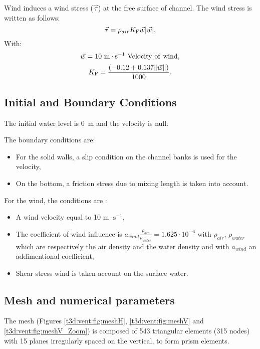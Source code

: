 \bigskip
Wind induces a wind stress ($\vec{\tau}$) at the free surface of channel.
The wind stress is written as follows:
\begin{equation*}
\vec{\tau}=\rho_{air}K_{\rm{F}} \vec w |\vec w|,
\end{equation*}
With:
\begin{equation*}
\vec w = 10~\text{m}\cdot\text{s}^{-1}\rm{~Velocity~of~wind},
\end{equation*}
\begin{equation*}
K_{\rm{F}} = \frac{(-0.12 + 0.137 \| \vec w \| )}{1000}.
\end{equation*}

\subsection{Initial and Boundary Conditions}

\bigskip
The initial water level is 0~m and the velocity is null.

\bigskip
The boundary conditions are:
\begin{itemize}
\item For the solid walls, a slip condition on the channel banks is used
for the velocity,
\item On the bottom, a friction stress due to mixing length is taken into account.
\end{itemize}
For the wind, the conditions are :
\begin{itemize}
\item A wind velocity equal to 10 $\text{m}\cdot\text{s}^{-1}$,
\item The coefficient of wind influence is $a_{wind} \frac{\rho_{air}}
{\rho_{water}} = 1.625 \cdot 10^{-6}$ with $\rho_{air}$, $\rho_{water}$
which are respectively the air density and the water density and
with $a_{wind}$ an addimentional coefficient,
\item Shear stress wind is taken account on the surface water.
\end{itemize}

\subsection{Mesh and numerical parameters}
\bigskip
The mesh (Figures \ref{t3d:vent:fig:meshH}, \ref{t3d:vent:fig:meshV} and
\ref{t3d:vent:fig:meshV_Zoom})  is composed of 543 triangular elements
(315 nodes) with 15 planes  irregularly spaced on the vertical, to form prism elements.

